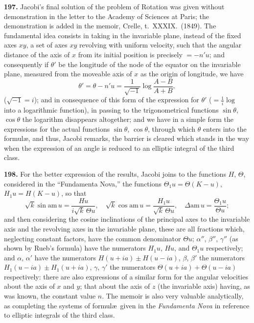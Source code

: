 \documentclass[11pt,a4paper]{book}
\begin{document}
\textbf{197.} Jacobi's final solution of the problem of Rotation was given without demonstration in the letter to the Academy of Sciences at Paris; the demonstration is added in the memoir, Crelle, t.~XXXIX.~(1849). The fundamental idea consists in taking in the invariable plane, instead of the fixed axes $xy$, a set of axes $xy$ revolving with uniform velocity, such that the angular distance of the axis of $x$ from its initial position is precisely $= -n'u$; and consequently if $\theta'$ be the longitude of the node of the equator on the invariable plane, measured from the moveable axis of $x$ as the origin of longitude, we have
\[
\theta' = \theta - n'u = \frac{1}{\sqrt{-1}}\log\frac{A - B}{A + B},
\]
($\sqrt{-1} = i$); and in consequence of this form of the expression for $\theta'$ ($= \frac{1}{i}\log$ into a logarithmic function), in passing to the trigonometrical functions $\sin\theta$, $\cos\theta$ the logarithm disappears altogether; and we have in a simple form the expressions for the actual functions $\sin\theta$, $\cos\theta$, through which $\theta$ enters into the formul\ae, and thus, Jacobi remarks, the barrier is cleared which stands in the way when the expression of an angle is reduced to an elliptic integral of the third class.

\textbf{198.} For the better expression of the results, Jacobi joins to the functions $H$, $\Theta$, considered in the ``Fundamenta Nova,'' the functions $\Theta_1 u = \Theta(K - u)$, $H_1 u = H(K - u)$, so that
\[
\sqrt{k}\sin\text{am}\,u = \frac{Hu}{i\sqrt{k}\,\Theta u}, \quad \sqrt{k}\cos\text{am}\,u = \frac{H_1 u}{\sqrt{k}\,\Theta u}, \quad \Delta\text{am}\,u = \frac{\Theta_1 u}{\Theta u};
\]
and then considering the cosine inclinations of the principal axes to the invariable axis and the revolving axes in the invariable plane, these are all fractions which, neglecting constant factors, have the common denominator $\Theta u$; $\alpha''$, $\beta''$, $\gamma''$ (as shown by Rueb's formula) have the numerators $H_1 u$, $Hu$, and $\Theta_1 u$ respectively; and $\alpha$, $\alpha'$ have the numerators $H(u + ia) \pm H(u - ia)$, $\beta$, $\beta'$ the numerators $H_1(u - ia) \pm H_1(u + ia)$, $\gamma$, $\gamma'$ the numerators $\Theta(u + ia) + \Theta(u - ia)$ respectively: there are also expressions of a similar form for the angular velocities about the axis of $x$ and $y$; that about the axis of $z$ (the invariable axis) having, as was known, the constant value $n$. The memoir is also very valuable analytically, as completing the systems of formul\ae\ given in the \textit{Fundamenta Nova} in reference to elliptic integrals of the third class.
\end{document}
